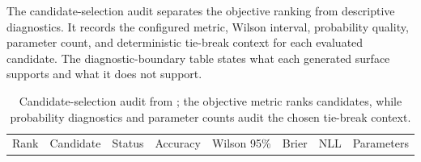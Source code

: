 \documentclass[
]{article}
\begin{document}
The candidate-selection audit separates the objective ranking from
descriptive diagnostics. It records the configured metric, Wilson
interval, probability quality, parameter count, and deterministic
tie-break context for each evaluated candidate. The diagnostic-boundary
table states what each generated surface supports and what it does not
support.

\begin{longtable}[]{@{}
  >{\raggedright\arraybackslash}p{}
  >{\raggedright\arraybackslash}p{}
  >{\raggedright\arraybackslash}p{}
  >{\raggedright\arraybackslash}p{}
  >{\raggedright\arraybackslash}p{}
  >{\raggedright\arraybackslash}p{}
  >{\raggedright\arraybackslash}p{}
  >{\raggedright\arraybackslash}p{}@{}}
\caption{Candidate-selection audit from
\protect{}; the
objective metric ranks candidates, while probability diagnostics and
parameter counts audit the chosen tie-break
context.}\label{tbl:candidate-selection-audit}\tabularnewline
\toprule\noalign{}
\begin{minipage}[b]{\linewidth}\raggedright
Rank
\end{minipage} & \begin{minipage}[b]{\linewidth}\raggedright
Candidate
\end{minipage} & \begin{minipage}[b]{\linewidth}\raggedright
Status
\end{minipage} & \begin{minipage}[b]{\linewidth}\raggedright
Accuracy
\end{minipage} & \begin{minipage}[b]{\linewidth}\raggedright
Wilson 95\%
\end{minipage} & \begin{minipage}[b]{\linewidth}\raggedright
Brier
\end{minipage} & \begin{minipage}[b]{\linewidth}\raggedright
NLL
\end{minipage} & \begin{minipage}[b]{\linewidth}\raggedright
Parameters
\end{minipage} \\

\end{longtable}
\end{document}
